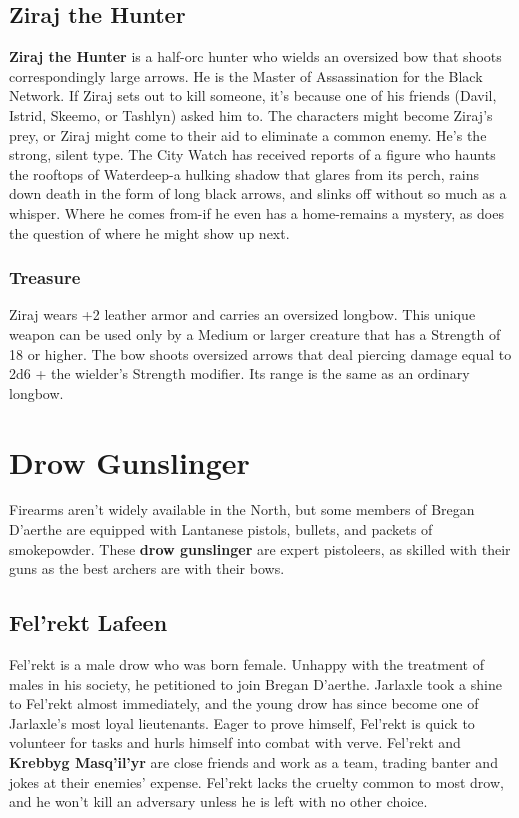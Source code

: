 \documentclass[10pt,a4paper,twoside,twocolumn,openany,nodeprecatedcode]{dndbook}
\begin{document}
\subsection{Ziraj the Hunter}
\textbf{Ziraj the Hunter} is a half-orc hunter who wields an oversized bow that shoots correspondingly large arrows. He is the Master of Assassination for the Black Network. If Ziraj sets out to kill someone, it's because one of his friends (Davil, Istrid, Skeemo, or Tashlyn) asked him to. The characters might become Ziraj's prey, or Ziraj might come to their aid to eliminate a common enemy. He's the strong, silent type.
The City Watch has received reports of a figure who haunts the rooftops of Waterdeep-a hulking shadow that glares from its perch, rains down death in the form of long black arrows, and slinks off without so much as a whisper. Where he comes from-if he even has a home-remains a mystery, as does the question of where he might show up next.
\subsubsection{Treasure}
Ziraj wears +2 leather armor and carries an oversized longbow. This unique weapon can be used only by a Medium or larger creature that has a Strength of 18 or higher. The bow shoots oversized arrows that deal piercing damage equal to 2d6 + the wielder's Strength modifier. Its range is the same as an ordinary longbow.
\section{Drow Gunslinger}
Firearms aren't widely available in the North, but some members of Bregan D'aerthe are equipped with Lantanese pistols, bullets, and packets of smokepowder. These \textbf{drow gunslinger} are expert pistoleers, as skilled with their guns as the best archers are with their bows.
\subsection{Fel'rekt Lafeen}
Fel'rekt is a male drow who was born female. Unhappy with the treatment of males in his society, he petitioned to join Bregan D'aerthe. Jarlaxle took a shine to Fel'rekt almost immediately, and the young drow has since become one of Jarlaxle's most loyal lieutenants. Eager to prove himself, Fel'rekt is quick to volunteer for tasks and hurls himself into combat with verve.
Fel'rekt and \textbf{Krebbyg Masq'il'yr} are close friends and work as a team, trading banter and jokes at their enemies' expense. Fel'rekt lacks the cruelty common to most drow, and he won't kill an adversary unless he is left with no other choice.
\end{document}
